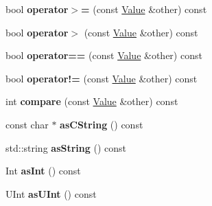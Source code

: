 \begin{DoxyCompactItemize}
\item 
\hypertarget{class_json_1_1_value_acc13fc47d55abd6e2327b090b83d2911}{bool {\bfseries operator$>$=} (const \hyperlink{class_json_1_1_value}{Value} \&other) const }\label{class_json_1_1_value_acc13fc47d55abd6e2327b090b83d2911}

\item 
\hypertarget{class_json_1_1_value_a3124a26067bdfde9571bc89527fc6931}{bool {\bfseries operator$>$} (const \hyperlink{class_json_1_1_value}{Value} \&other) const }\label{class_json_1_1_value_a3124a26067bdfde9571bc89527fc6931}

\item 
\hypertarget{class_json_1_1_value_a14363dda23a6ae2def9afd1590ae85d3}{bool {\bfseries operator==} (const \hyperlink{class_json_1_1_value}{Value} \&other) const }\label{class_json_1_1_value_a14363dda23a6ae2def9afd1590ae85d3}

\item 
\hypertarget{class_json_1_1_value_ad0f12d2a4ab74bbef08a05504b2cb81d}{bool {\bfseries operator!=} (const \hyperlink{class_json_1_1_value}{Value} \&other) const }\label{class_json_1_1_value_ad0f12d2a4ab74bbef08a05504b2cb81d}

\item 
\hypertarget{class_json_1_1_value_a899214ed2253d3f4f061b922b0e622b5}{int {\bfseries compare} (const \hyperlink{class_json_1_1_value}{Value} \&other) const }\label{class_json_1_1_value_a899214ed2253d3f4f061b922b0e622b5}

\item 
\hypertarget{class_json_1_1_value_a5b7da48b163bcec63b1424f1608b7da6}{const char $\ast$ {\bfseries as\-C\-String} () const }\label{class_json_1_1_value_a5b7da48b163bcec63b1424f1608b7da6}

\item 
\hypertarget{class_json_1_1_value_a03ee3d5df576640c93ba683f140828bd}{std\-::string {\bfseries as\-String} () const }\label{class_json_1_1_value_a03ee3d5df576640c93ba683f140828bd}

\item 
\hypertarget{class_json_1_1_value_ac786e35b860b1d700cb3d3e56dd6a235}{Int {\bfseries as\-Int} () const }\label{class_json_1_1_value_ac786e35b860b1d700cb3d3e56dd6a235}

\item 
\hypertarget{class_json_1_1_value_a2019d1bd296b89356c1b0da5970c918c}{U\-Int {\bfseries as\-U\-Int} () const }\label{class_json_1_1_value_a2019d1bd296b89356c1b0da5970c918c}


\end{DoxyCompactItemize}
